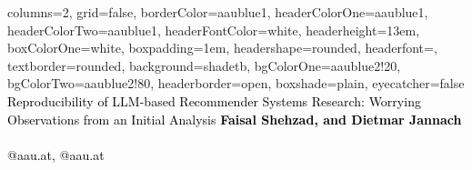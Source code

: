 \documentclass[a0paper,portrait]{baposter}
\begin{document}

\begin{poster}{
  columns=2,
	grid=false,
	borderColor=aaublue1,
	headerColorOne=aaublue1,
	headerColorTwo=aaublue1,
	headerFontColor=white,
  headerheight=13em,
	boxColorOne=white,
  boxpadding=1em,
	headershape=rounded,
	headerfont=\Large\textsf,
	textborder=rounded,
	background=shadetb,
  bgColorOne=aaublue2!20,
  bgColorTwo=aaublue2!80,
	headerborder=open,
  boxshade=plain,
  eyecatcher=false
}
{
}
{\vspace*{1em}%
 \fontsize{26}{33}\selectfont
 \textcolor{black}{Reproducibility of LLM-based Recommender Systems Research: Worrying Observations from an Initial Analysis}}
{
  \vspace{1em}\textcolor{black}{\textbf{Faisal Shehzad, and Dietmar Jannach}\\
	{}\\
	{@aau.at}, 
	{@aau.at}
}}




\end{poster}
\end{document}
